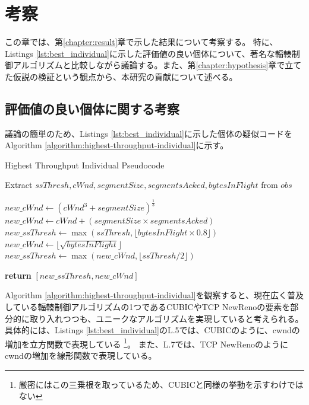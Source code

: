 \documentclass[a4paper,11pt]{jreport}
\newcommand{\chapref}[1]{第\ref{#1}章}
\newcommand{\algorithmref}[1]{Algorithm \ref{#1}}
\begin{document}
\chapter{考察}
\label{chapter:discussion}
この章では、\chapref{chapter:result}で示した結果について考察する。
特に、Listings \ref{lst:best_individual}に示した評価値の良い個体について、著名な輻輳制御アルゴリズムと比較しながら議論する。また、\chapref{chapter:hypothesis}で立てた仮説の検証という観点から、本研究の貢献について述べる。

\section{評価値の良い個体に関する考察}
議論の簡単のため、Listings \ref{lst:best_individual}に示した個体の疑似コードを\algorithmref{algorithm:highest-throughput-individual}に示す。
\begin{algorithm}
  \caption{Highest Throughput Individual Pseudocode}
  \label{algorithm:highest-throughput-individual}
  \begin{algorithmic}[1]

      \State Extract $ssThresh, cWnd, segmentSize, segmentsAcked, bytesInFlight$ from $obs$

              \State $new\_cWnd \gets (cWnd^3 + segmentSize)^{\frac{1}{3}}$
          \Else
              \State $new\_cWnd \gets cWnd + (segmentSize \times segmentsAcked)$
          \EndIf
          \State $new\_ssThresh \gets \max(ssThresh, \lfloor bytesInFlight \times 0.8 \rfloor)$
      \Else
          \State $new\_cWnd \gets \lfloor \sqrt{bytesInFlight} \rfloor$
          \State $new\_ssThresh \gets \max(new\_cWnd, \lfloor ssThresh / 2 \rfloor)$
      \EndIf

      \State \textbf{return} $[new\_ssThresh, new\_cWnd]$
  \EndProcedure

  \end{algorithmic}
\end{algorithm}
\algorithmref{algorithm:highest-throughput-individual}を観察すると、現在広く普及している輻輳制御アルゴリズムの1つであるCUBIC\cite{cubic}やTCP NewReno\cite{floyd2004newreno,henderson2012newreno}の要素を部分的に取り入れつつも、ユニークなアルゴリズムを実現していると考えられる。
具体的には、Listings \ref{lst:best_individual}のL.5では、CUBICのように、cwndの増加を立方関数で表現している
\footnote{厳密にはこの三乗根を取っているため、CUBICと同様の挙動を示すわけではない}。
また、L.7では、TCP NewRenoのようにcwndの増加を線形関数で表現している。
\end{document}
